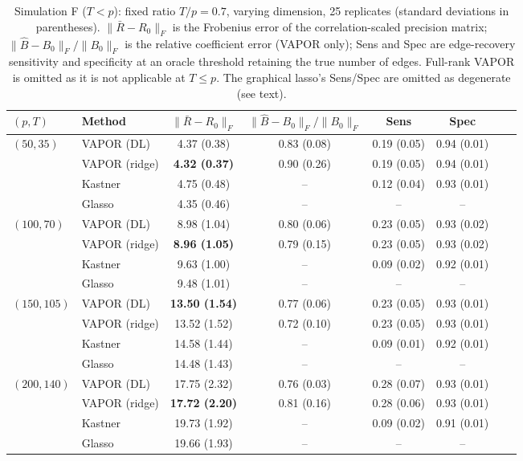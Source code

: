 \begin{table}[h!]
\centering
\caption{Simulation F ($T<p$): fixed ratio $T/p=0.7$, varying dimension, 25 replicates (standard deviations in parentheses). $\|\bar R-R_0\|_F$ is the Frobenius error of the correlation-scaled precision matrix; $\|\hat B-B_0\|_F/\|B_0\|_F$ is the relative coefficient error (VAPOR only); Sens and Spec are edge-recovery sensitivity and specificity at an oracle threshold retaining the true number of edges. Full-rank VAPOR is omitted as it is not applicable at $T\le p$. The graphical lasso's Sens/Spec are omitted as degenerate (see text).}
\label{tab:sim-f}
\centering
\small
\begin{tabular}{llcccccc}
\toprule
$(p,T)$ & Method & $\|\bar R-R_0\|_F$ & $\|\hat B-B_0\|_F/\|B_0\|_F$ & Sens & Spec \\
\midrule
\multirow{4}{*}{$(50,35)$}
  & VAPOR (DL)    & 4.37 (0.38) & 0.83 (0.08) & 0.19 (0.05) & 0.94 (0.01)\\
  & VAPOR (ridge) & \textbf{4.32 (0.37)} & 0.90 (0.26) & 0.19 (0.05) & 0.94 (0.01)\\
  & Kastner       & 4.75 (0.48) & --          & 0.12 (0.04) & 0.93 (0.01)\\
  & Glasso        & 4.35 (0.46) & --          & --          & --\\
\midrule
\multirow{4}{*}{$(100,70)$}
  & VAPOR (DL)    & 8.98 (1.04) & 0.80 (0.06) & 0.23 (0.05) & 0.93 (0.02)\\
  & VAPOR (ridge) & \textbf{8.96 (1.05)} & 0.79 (0.15) & 0.23 (0.05) & 0.93 (0.02)\\
  & Kastner       & 9.63 (1.00) & --          & 0.09 (0.02) & 0.92 (0.01)\\
  & Glasso        & 9.48 (1.01) & --          & --          & --\\
\midrule
\multirow{4}{*}{$(150,105)$}
  & VAPOR (DL)    & \textbf{13.50 (1.54)} & 0.77 (0.06) & 0.23 (0.05) & 0.93 (0.01)\\
  & VAPOR (ridge) & 13.52 (1.52) & 0.72 (0.10) & 0.23 (0.05) & 0.93 (0.01)\\
  & Kastner       & 14.58 (1.44) & --          & 0.09 (0.01) & 0.92 (0.01)\\
  & Glasso        & 14.48 (1.43) & --          & --          & --\\
\midrule
\multirow{4}{*}{$(200,140)$}
  & VAPOR (DL)    & 17.75 (2.32) & 0.76 (0.03) & 0.28 (0.07) & 0.93 (0.01)\\
  & VAPOR (ridge) & \textbf{17.72 (2.20)} & 0.81 (0.16) & 0.28 (0.06) & 0.93 (0.01)\\
  & Kastner       & 19.73 (1.92) & --          & 0.09 (0.02) & 0.91 (0.01)\\
  & Glasso        & 19.66 (1.93) & --          & --          & --\\
\bottomrule
\end{tabular}
\end{table}

